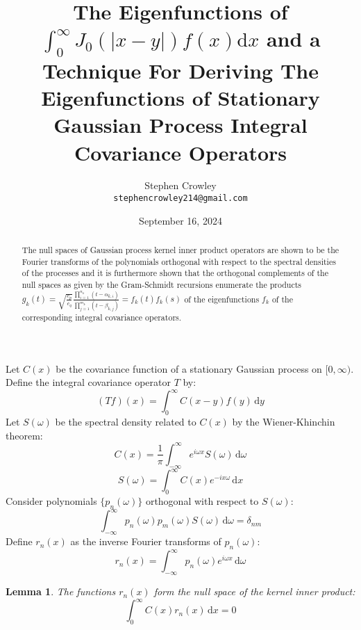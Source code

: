 \documentclass{article}
\title{The Eigenfunctions of $\int_0^{\infty} J_0 (| x - y |) f (x) \mathrm{d} x$
and a Technique For Deriving The Eigenfunctions of Stationary Gaussian Process
Integral Covariance Operators}
\author{Stephen Crowley \\ \texttt{stephencrowley214@gmail.com}}
\date{September 16, 2024}
\newtheorem{lemma}{Lemma}
\begin{document}
\maketitle

\begin{abstract}
The null spaces of Gaussian process kernel inner product operators are
shown to be the Fourier transforms of the polynomials orthogonal with
respect to the spectral densities of the processes and it is furthermore
shown that the orthogonal complements of the null spaces as given by the
Gram-Schmidt recursions enumerate the products $g_k (t) =
\sqrt{\frac{c_p}{c_q}} \frac{\prod_{i = 1}^{n_k} (t - \alpha_{k,
i})}{\prod_{j = 1}^{m_k} (t - \beta_{k, j})} = f_k (t) f_k (s)$ of the
eigenfunctions $f_k$ of the corresponding integral covariance operators.
\end{abstract}

Let $C (x)$ be the covariance function of a stationary Gaussian process on
$[0, \infty)$. Define the integral covariance operator $T$ by:
\begin{equation}
(Tf) (x) = \int_0^{\infty} C (x - y) f (y) \, \mathrm{d} y
\end{equation}
Let $S (\omega)$ be the spectral density related to $C (x)$ by the
Wiener-Khinchin theorem:
\begin{equation}
C (x) = \frac{1}{\pi} \int_{- \infty}^{\infty} e^{i \omega x} S (\omega) 
\, \mathrm{d} \omega
\end{equation}
\begin{equation}
S (\omega) = \int_0^{\infty} C (x) e^{- ix \omega} \, \mathrm{d} x
\end{equation}
Consider polynomials $\{p_n (\omega)\}$ orthogonal with respect to $S
(\omega)$:
\begin{equation}
\int_{- \infty}^{\infty} p_n (\omega) p_m (\omega) S (\omega) 
\, \mathrm{d} \omega = \delta_{nm}
\end{equation}
Define $r_n (x)$ as the inverse Fourier transforms of $p_n (\omega)$:
\begin{equation}
r_n (x) = \int_{- \infty}^{\infty} p_n (\omega) e^{i \omega x} 
\, \mathrm{d} \omega
\end{equation}
\begin{lemma}
The functions $r_n (x)$ form the null space of the kernel inner product:
\begin{equation}
\int_0^{\infty} C (x) r_n (x) \, \mathrm{d} x = 0
\end{equation}
\end{lemma}
\end{document}
